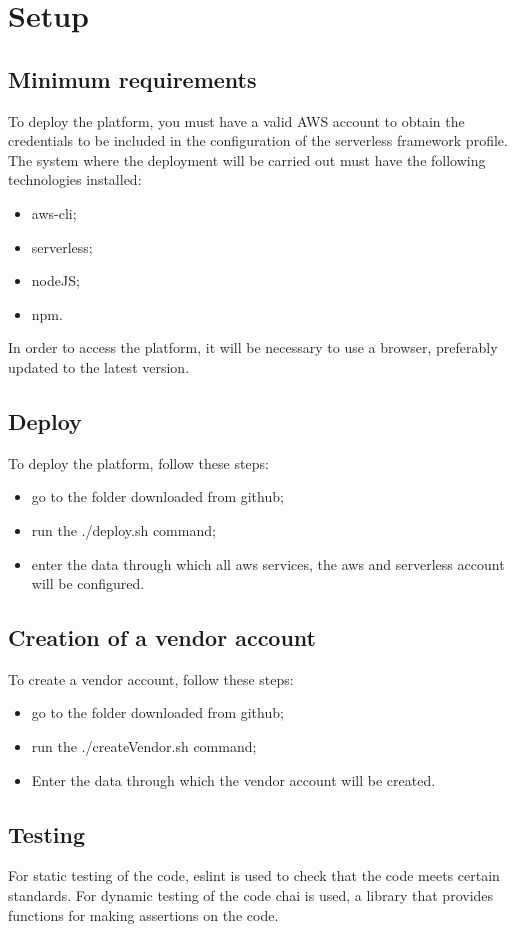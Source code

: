 \section{Setup}
\subsection{Minimum requirements}
To deploy the platform, you must have a valid AWS account to obtain the credentials to be included in the configuration of the serverless framework profile.\newline
The system where the deployment will be carried out must have the following technologies installed:
\begin{itemize}
    \item aws-cli;
    \item serverless;
    \item nodeJS;
    \item npm.
\end{itemize}
In order to access the platform, it will be necessary to use a browser, preferably updated to the latest version.
\subsection{Deploy}
To deploy the platform, follow these steps:
\begin{itemize}
    \item go to the folder downloaded from github;
    \item run the ./deploy.sh command;
    \item enter the data through which all aws services, the aws and serverless account will be configured.
\end{itemize}
\subsection{Creation of a vendor account}
To create a vendor account, follow these steps:
\begin{itemize}
    \item go to the folder downloaded from github;
    \item run the ./createVendor.sh command;
    \item Enter the data through which the vendor account will be created.
\end{itemize}
\subsection{Testing}
For static testing of the code, eslint is used to check that the code meets certain standards.\newline
For dynamic testing of the code chai is used, a library that provides functions for making assertions on the code.